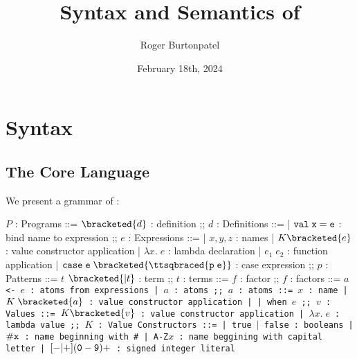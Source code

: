 \documentclass[]{article}
\title{Syntax and Semantics of \PPlus}
\author{Roger Burtonpatel}
\date{February 18th, 2024}
\begin{document}
\maketitle

\section{Syntax}

\subsection{The Core Language}

We present a grammar of \PPlus: 

\bigskip

\begin{center}
    \begin{bnf}
    $P$ : \textsf{Programs} ::=
    $\bracketed{d}$ : definition
    ;;
    $d$ : \textsf{Definitions} ::=
    | $\tt{val} \; x \; \tt{=} \; e$ : bind name to expression
    ;;
    $e$ : Expressions ::= 
    | $x, y, z$ : names
    | $K\bracketed{e}$ : value constructor application 
    | $\lambda x. \; e$ : lambda declaration  
    | $e_{1} \; e_{2}$ : function application 
    | $\tt{case} \; e \; \bracketed{\ttsqbraced{p \; e}}$ : case expression 
    ;;
    $p$ : \textsf{Patterns} ::= $t$ $\bracketed{\vert t}$ : term
    ;;
    $t$ : terms ::= $f$  : factor
    ;;
    $f$ : factors ::= $a$ \tt{<-} $e$ : atoms from expressions 
        | $a$ : atoms 
    ;;
    $a$ : atoms ::= $x$ : name 
    | $K \; \bracketed{a}$ : value constructor application 
    | 
    | \tt{when} $e$
    ;;
    $v$ : Values ::= $K\bracketed{v}$ : value constructor application 
    | $\lambda x. \; e$ : lambda value 
    ;;
    $K$ : \textsf{Value Constructors} ::=
    | \tt{true} $\vert$ \tt{false} : booleans
    | $\tt{\#}x$ : name beginning with \tt{\#}
    | \tt{A-Z}$x$ : name beggining with capital letter
    | $[\tt{-}\vert\tt{+}](\tt{0}-\tt{9})+$ : signed integer literal 
    \end{bnf}
\end{center}
\end{document}
